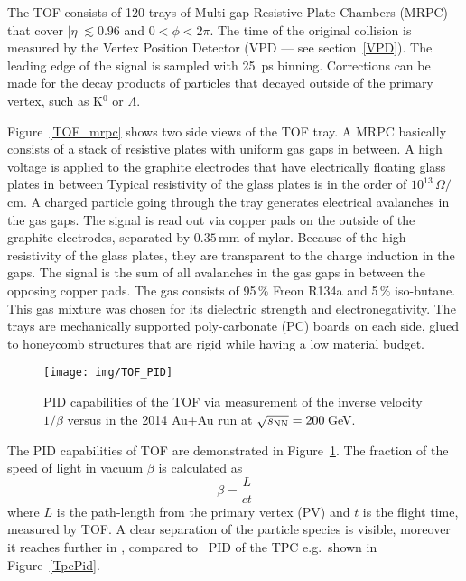 The TOF consists of 120 trays of Multi-gap Resistive Plate Chambers (MRPC)~\cite{MRPC} that cover $|\eta| \lesssim 0.96$ and $0 < \phi < 2\pi$. The time of the original collision is measured 
by the Vertex Position Detector (VPD --- see section~\ref{VPD}). The leading edge of 
the signal is sampled with \SI{25}{\pico\second} binning. Corrections can be made for the decay products of particles that 
decayed outside of the primary vertex, such as K$^0$ or $\Lambda$\@. 



Figure~\ref{TOF_mrpc} shows two side views of the TOF tray. A MRPC basically consists of a stack of resistive plates with uniform gas gaps in between. A high voltage is applied to the graphite electrodes that have electrically floating glass plates in between Typical resistivity of the glass plates is in the order of $10^13\,\Omega/$cm. A charged particle going through the tray generates electrical avalanches in the gas gaps. The signal is read out via copper pads on the outside of the graphite electrodes, separated by $0.35\,$mm of mylar. Because of the high resistivity of the glass plates, they are transparent to the charge induction in the gaps. The signal is the sum of all avalanches in the gas gaps in between the opposing copper pads. The gas consists of 95$\,\%$ Freon R134a and 5$\,\%$ iso-butane. This gas mixture was chosen for its dielectric strength and electronegativity. The trays are mechanically supported poly-carbonate (PC) boards on each side, glued to honeycomb structures that are rigid while having a low material budget.

\begin{figure}[!htb]
\begin{center}
 \texttt{[image: img/TOF\_PID]}\\
\end{center}
\caption{\label{TOF_pid}PID capabilities of the TOF via measurement of the inverse velocity $1/\beta$ versus \pt in the 2014 Au+Au run at $\sqrt{s_\text{NN}} = 200\,$GeV\@. }
\end{figure}

The PID capabilities of TOF are demonstrated in Figure~\ref{TOF_pid}\@. The fraction of the speed of light in vacuum $\beta$ is calculated as
\begin{equation}
 \beta = \frac{L}{ct}
\end{equation}
where $L$ is the path-length from the primary vertex (PV) and $t$ is the flight time, measured by TOF\@.
A clear separation of the particle species is visible, moreover it reaches further in \pt, compared to \dedx\ PID of the TPC e.g.\ shown in Figure~\ref{TpcPid}\@.

